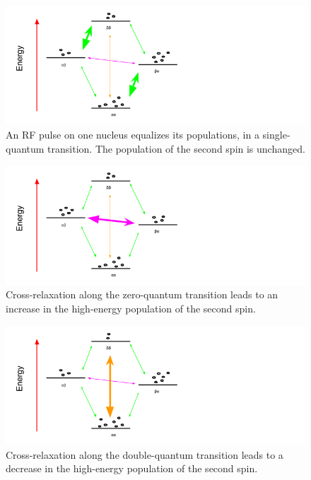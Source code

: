 \begin{figure}[h]
  \includegraphics[scale=0.5]{figures/two_spins_rf}
  \caption[An RF pulse on one nucleus equalizes its populations.]
          {An RF pulse on one nucleus equalizes its populations, in a 
           single-quantum transition.  The population of the second spin
           is unchanged.}
  \label{two_spins_rf}
\end{figure}

\begin{figure}[h]
  \includegraphics[scale=0.5]{figures/two_spins_w0}
  \caption[Cross-relaxation along the zero-quantum transition.]
          {Cross-relaxation along the zero-quantum transition leads to 
           an increase in the high-energy population of the second spin.}
  \label{two_spins_w0}
\end{figure}

\begin{figure}[h]
  \includegraphics[scale=0.5]{figures/two_spins_w2}
  \caption[Cross-relaxation along the double-quantum transition.]
          {Cross-relaxation along the double-quantum transition leads to
           a decrease in the high-energy population of the second spin.}
  \label{two_spins_w2}
\end{figure}

